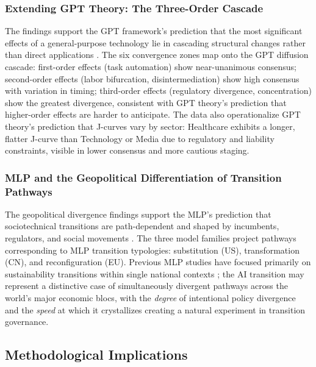 \documentclass[preprint,review,12pt]{elsarticle}
\begin{document}
\subsubsection{Extending GPT Theory: The Three-Order Cascade}
\label{sec:extending_gpt}

The findings support the GPT framework's prediction that the most significant effects of a general-purpose technology lie in cascading structural changes rather than direct applications \citep{bresnahan1995gpt, helpman1998gpt}. The six convergence zones map onto the GPT diffusion cascade: first-order effects (task automation) show near-unanimous consensus; second-order effects (labor bifurcation, disintermediation) show high consensus with variation in timing; third-order effects (regulatory divergence, concentration) show the greatest divergence, consistent with GPT theory's prediction that higher-order effects are harder to anticipate. The data also operationalize GPT theory's prediction that J-curves vary by sector: Healthcare exhibits a longer, flatter J-curve than Technology or Media due to regulatory and liability constraints, visible in lower consensus and more cautious staging.


\subsubsection{MLP and the Geopolitical Differentiation of Transition Pathways}
\label{sec:mlp_geopolitical}

The geopolitical divergence findings support the MLP's prediction that sociotechnical transitions are path-dependent and shaped by incumbents, regulators, and social movements \citep{geels2020microfoundations, kern2012mlppolicy}. The three model families project pathways corresponding to MLP transition typologies: substitution (US), transformation (CN), and reconfiguration (EU). Previous MLP studies have focused primarily on sustainability transitions within single national contexts \citep{roberts2019accelerated}; the AI transition may represent a distinctive case of simultaneously divergent pathways across the world's major economic blocs, with the \textit{degree} of intentional policy divergence and the \textit{speed} at which it crystallizes creating a natural experiment in transition governance.


\subsection{Methodological Implications}
\label{sec:methodological_implications}
\end{document}

